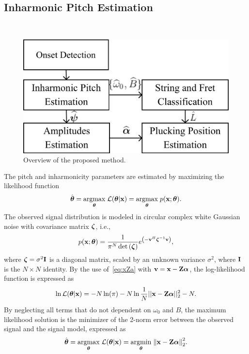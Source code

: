 \documentclass{article}
\begin{document}
\subsection{Inharmonic Pitch Estimation} %
\label{sec:proposed_estimator}
\begin{figure}[t]\
  \centering
  \centerline{\includegraphics[width=.7\columnwidth]{img/block3.png}}\vspace{-2mm}
  \caption{Overview of the proposed method.}\label{fig:overview}\vspace{-2mm}
\end{figure}
The pitch and inharmonicity parameters are estimated by maximizing the likelihood function %
\begin{equation}
    \hat{\boldsymbol\theta} = \underset{\text{\boldmath$\theta$}}{\operatorname{argmax}}\;{\mathcal{L}(\text{\boldmath$\theta$} | \mathbf x)} = \underset{\text{\boldmath$\theta$}}{\operatorname{argmax}}\;{p(\mathbf x ; \text{\boldmath$\theta$})}.
\end{equation}
The observed signal distribution is modeled in circular complex white Gaussian noise with covariance matrix $\boldsymbol{\zeta}$, i.e., 
\begin{equation} 
    p(\mathbf x ; \text{\boldmath$\theta$}) = \frac{1}{\pi^N\det{(\boldsymbol{\zeta})}} e^{\left(-\mathbf v^H\boldsymbol{\zeta}^{-1}\mathbf v\right)},
\end{equation}
where $\boldsymbol{\zeta}=\sigma^2\mathbf{I}$ is a diagonal matrix, scaled by an unknown variance $\sigma^2$, where $\mathbf{I}$ is the $N \times N$ identity. By the use of~\eqref{eq:xZa} with $\mathbf v = \mathbf x - \mathbf{Z} \text{\boldmath$\alpha$}$, 
the log-likelihood function is expressed as
\begin{equation}\label{eq:log_likelihood2}
    \ln\mathcal{L}(\text{\boldmath$\theta$}|\mathbf x) = -N \ln(\pi) - N \ln \frac{1}{N}|| \mathbf x-\mathbf{Z} \text{\boldmath$\alpha$} ||_2^2 - N.
\end{equation}
By neglecting all terms that do not dependent on $\omega_0$ and $B$, the maximum likelihood solution is the minimizer of the 2-norm error between the observed signal and the signal model, expressed as
\begin{equation}
  \hat{\boldsymbol\theta} =  \underset{\text{\boldmath$\theta$}}{\operatorname{argmax}}\;{\mathcal{L}(\text{\boldmath$\theta$} | \mathbf x)}  =\underset{\text{\boldmath$\theta$}}{\operatorname{argmin}}\;{\left\lVert\mathbf x-\mathbf{Z} \text{\boldmath$\alpha$}\right\rVert_2^2}.
\end{equation}
\end{document}
